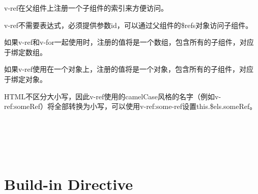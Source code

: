 v-ref在父组件上注册一个子组件的索引来方便访问。

v-ref不需要表达式，必须提供参数id，可以通过父组件的\$refs对象访问子组件。

\begin{compactitem}
\item 如果v-ref和v-for一起使用时，注册的值将是一个数组，包含所有的子组件，对应于绑定数组。
\item 如果v-ref使用在一个对象上，注册的值将是一个对象，包含所有的子组件，对应于绑定对象。
\end{compactitem}

HTML不区分大小写，因此v-ref使用的camelCase风格的名字（例如v-ref:someRef）将全部转换为小写，可以使用v-ref:some-ref设置this.\$els.someRef。










\begin{lstlisting}[language=JavaScript]

\end{lstlisting}




\begin{lstlisting}[language=JavaScript]

\end{lstlisting}




\begin{lstlisting}[language=JavaScript]

\end{lstlisting}




\begin{lstlisting}[language=JavaScript]

\end{lstlisting}




\begin{lstlisting}[language=JavaScript]

\end{lstlisting}




\begin{lstlisting}[language=JavaScript]

\end{lstlisting}


\chapter{Build-in Directive}


